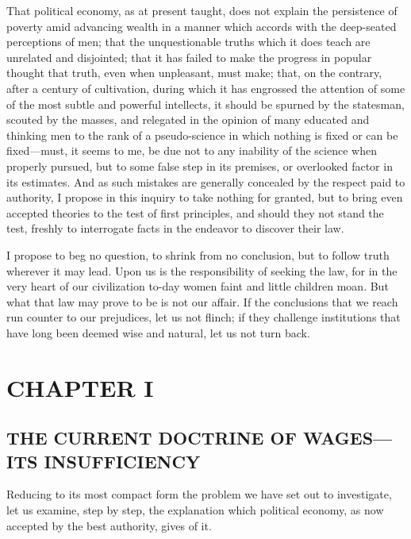 That political economy, as at present taught, does not explain the
persistence of poverty amid advancing wealth in a manner which accords
with the deep-seated perceptions of men; that the unquestionable truths
which it does teach are unrelated and disjointed; that it has failed to
make the progress in popular thought that truth, even when unpleasant,
must make; that, on the contrary, after a century of cultivation, during
which it has engrossed the attention of some of the most subtle and
powerful intellects, it should be spurned by the statesman, scouted by
the masses, and relegated in the opinion of many educated and thinking
men to the rank of a pseudo-science in which nothing is fixed or can be
fixed---must, it seems to me, be due not to any inability of the science
when properly pursued, but to some false step in its premises, or
overlooked factor in its estimates. And as such mistakes are generally
concealed by the respect paid to authority, I propose in this inquiry to
take nothing for granted, but to bring even accepted theories to the
test of first principles, and should they not stand the test, freshly to
interrogate facts in the endeavor to discover their law.

I propose to beg no question, to shrink from no conclusion, but to
follow truth wherever it may lead. Upon us is the responsibility of
seeking the law, for in the very heart of our civilization to-day women
faint and little children moan. But what that law may prove to be is not
our affair. If the conclusions that we reach run counter to our
prejudices, let us not flinch; if they challenge institutions that have
long been deemed wise and natural, let us not turn back.

\newpage

\hypertarget{Book1Chapter1}{%
\section{CHAPTER I}\label{Book1Chapter1}}

\hypertarget{the-current-doctrine-of-wagesits-insufficiency}{%
\subsection{THE CURRENT DOCTRINE OF WAGES---ITS
INSUFFICIENCY}\label{the-current-doctrine-of-wagesits-insufficiency}}

Reducing to its most compact form the problem we have set out to
investigate, let us examine, step by step, the explanation which
political economy, as now accepted by the best authority, gives of it.

